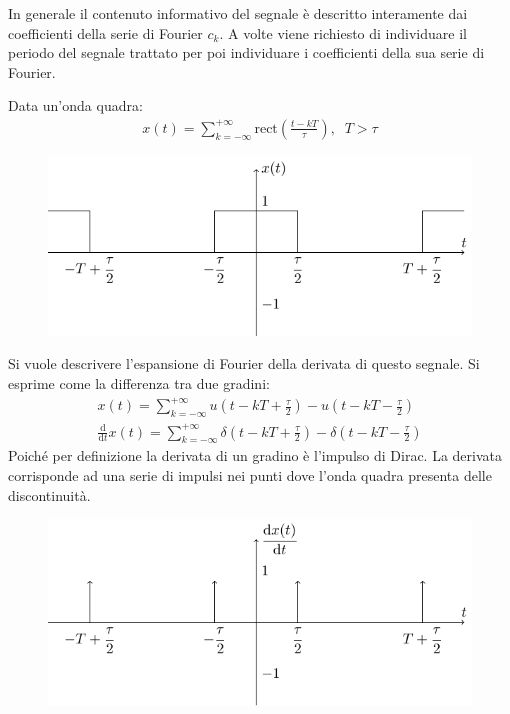\documentclass{article}
\newcommand{\rect}{\mathrm{rect}}
\newcommand{\df}{\mathrm{d}}
\numberwithin{equation}{subsection}
\begin{document}
In generale il contenuto informativo del segnale è descritto interamente dai coefficienti della serie di Fourier $c_k$. 
A volte viene richiesto di individuare il periodo del segnale trattato per poi individuare i coefficienti della sua serie di Fourier.




Data un'onda quadra: 
\begin{gather*}
    x(t)=\displaystyle\sum_{k=-\infty}^{+\infty}\rect{\left(\frac{t-kT}{\tau}\right)},\;\; T>\tau
\end{gather*}

\begin{figure}[H]%
    \centering
    \includegraphics{onda-quadra-3.pdf}%
\end{figure}

Si vuole descrivere l'espansione  di Fourier della derivata di questo segnale. Si esprime come la differenza tra due gradini:
\begin{gather*}
    x(t)=\displaystyle\sum_{k=-\infty}^{+\infty}u\left(t-kT+\frac{\tau}{2}\right)-u\left(t-kT-\frac{\tau}{2}\right)\\
    \displaystyle\frac{\df}{\df t}x(t)=\sum_{k=-\infty}^{+\infty}\delta\left(t-kT+\frac{\tau}{2}\right)-\delta\left(t-kT-\frac{\tau}{2}\right)
\end{gather*}
Poiché per definizione la derivata di un gradino è l'impulso di Dirac. La derivata corrisponde ad una serie di impulsi nei punti dove l'onda quadra presenta delle discontinuità. 

\begin{figure}[H]%
    \centering
    \includegraphics{serie-impulsi-1.pdf}%
\end{figure}
\end{document}
